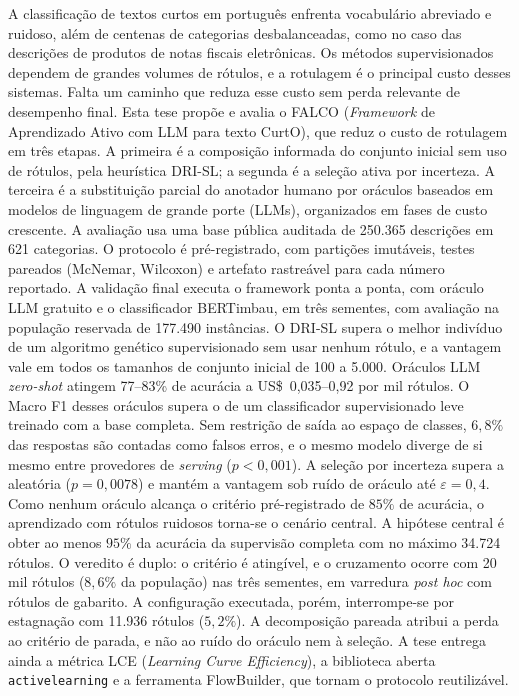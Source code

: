 \begin{resumo}

A classificação de textos curtos em português enfrenta vocabulário abreviado
e ruidoso, além de centenas de categorias desbalanceadas, como no caso das
descrições de produtos de notas fiscais eletrônicas. Os métodos
supervisionados dependem de grandes volumes de rótulos, e a rotulagem é o
principal custo desses sistemas. Falta um caminho que reduza esse custo sem
perda relevante de desempenho final. Esta tese propõe e avalia o FALCO
(\textit{Framework} de Aprendizado Ativo com LLM para texto CurtO), que reduz
o custo de rotulagem em três etapas. A primeira é a composição informada do
conjunto inicial sem uso de rótulos, pela heurística DRI-SL; a segunda é a
seleção ativa por incerteza. A terceira é a substituição parcial do anotador
humano por oráculos baseados em modelos de linguagem de grande porte (LLMs),
organizados em fases de custo crescente. A avaliação usa uma base pública
auditada de 250.365 descrições em 621 categorias. O protocolo é
pré-registrado, com partições imutáveis, testes pareados (McNemar, Wilcoxon)
e artefato rastreável para cada número reportado. A validação final executa o
framework ponta a ponta, com oráculo LLM gratuito e o classificador
BERTimbau, em três sementes, com avaliação na população reservada de 177.490
instâncias. O DRI-SL supera o melhor indivíduo de um algoritmo genético
supervisionado sem usar nenhum rótulo, e a vantagem vale em todos os tamanhos
de conjunto inicial de 100 a 5.000. Oráculos LLM \textit{zero-shot} atingem
77--83\% de acurácia a US\$~0,035--0,92 por mil rótulos. O Macro F1 desses
oráculos supera o de um classificador supervisionado leve treinado com a base
completa. Sem restrição de saída ao espaço de classes, $6{,}8\%$ das
respostas são contadas como falsos erros, e o mesmo modelo diverge de si
mesmo entre provedores de \textit{serving} ($p<0{,}001$). A seleção por
incerteza supera a aleatória ($p=0{,}0078$) e mantém a vantagem sob ruído de
oráculo até $\varepsilon=0{,}4$. Como nenhum oráculo alcança o critério
pré-registrado de $85\%$ de acurácia, o aprendizado com rótulos ruidosos
torna-se o cenário central. A hipótese central é obter ao menos $95\%$ da
acurácia da supervisão completa com no máximo 34.724 rótulos. O veredito é
duplo: o critério é atingível, e o cruzamento ocorre com 20 mil rótulos
($8{,}6\%$ da população) nas três sementes, em varredura \textit{post hoc}
com rótulos de gabarito. A configuração executada, porém, interrompe-se por estagnação
com 11.936 rótulos ($5{,}2\%$). A decomposição pareada atribui a perda ao
critério de parada, e não ao ruído do oráculo nem à seleção. A tese entrega
ainda a métrica LCE
(\textit{Learning Curve Efficiency}), a biblioteca aberta
\texttt{activelearning} e a ferramenta FlowBuilder, que tornam o protocolo
reutilizável.

\end{resumo}
